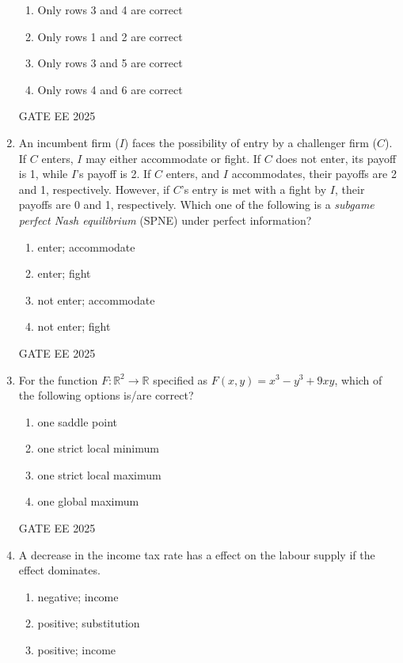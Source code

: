 \documentclass[journal,12pt,onecolumn]{IEEEtran}
\theoremstyle{remark}
\begin{document}
\begin{enumerate}
\begin{enumerate}[label=(\Alph*)]
\item Only rows 3 and 4 are correct
\item Only rows 1 and 2 are correct
\item Only rows 3 and 5 are correct
\item Only rows 4 and 6 are correct
\end{enumerate}
GATE EE 2025\\
\item An incumbent firm ($I$) faces the possibility of entry by a challenger firm ($C$). If $C$ enters, $I$ may either accommodate or fight. If $C$ does not enter, its payoff is 1, while $I$'s payoff is 2. If $C$ enters, and $I$ accommodates, their payoffs are 2 and 1, respectively. However, if $C$'s entry is met with a fight by $I$, their payoffs are 0 and 1, respectively. Which one of the following is a \textit{subgame perfect Nash equilibrium} (SPNE) under perfect information?
\begin{enumerate}[label=(\Alph*)]
\item enter; accommodate
\item enter; fight
\item not enter; accommodate
\item not enter; fight
\end{enumerate}
GATE EE 2025\\
\item For the function $F: \mathbb{R}^2 \to \mathbb{R}$ specified as $F(x, y) = x^3 - y^3 + 9xy$, which of the following options is/are correct?
\begin{enumerate}[label=(\Alph*)]
\item one saddle point
\item one strict local minimum
\item one strict local maximum
\item one global maximum
\end{enumerate}
GATE EE 2025\\
\item A decrease in the income tax rate has a \underline{\hspace{1cm}} effect on the labour supply if the \underline{\hspace{1cm}} effect dominates.
\begin{enumerate}[label=(\Alph*)]
\item negative; income
\item positive; substitution
\item positive; income

\end{enumerate}
\end{enumerate}
\end{document}
